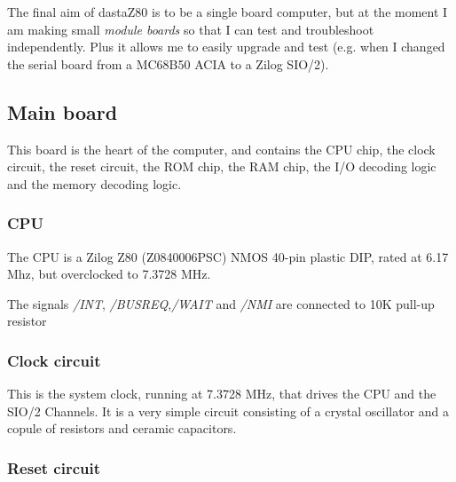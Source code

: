 \documentclass[a4paper,11pt]{article}
\begin{document}
    The final aim of dastaZ80 is to be a single board computer, but at the 
    moment I am making small \textit{module boards} so that I can test and 
    troubleshoot independently. Plus it allows me to easily upgrade and test
    (e.g. when I changed the serial board from a MC68B50 ACIA to a Zilog SIO/2).

    \subsection{Main board}

    This board is the heart of the computer, and contains the CPU chip, the 
    clock circuit, the reset circuit, the ROM chip, the RAM chip, the I/O
    decoding logic and the memory decoding logic.

    \subsubsection{CPU}

    The CPU is a Zilog Z80 (Z0840006PSC) NMOS 40-pin plastic DIP, rated at 6.17
    Mhz, but overclocked to 7.3728 MHz.

    The signals \textit{/INT}, \textit{/BUSREQ},\textit{/WAIT} and \textit{/NMI}
    are connected to 10K pull-up resistor

    \subsubsection{Clock circuit}

    This is the system clock, running at 7.3728 MHz, that drives the CPU and the
    SIO/2 Channels. It is a very simple circuit consisting of a crystal
    oscillator and a copule of resistors and ceramic capacitors.

    \subsubsection{Reset circuit}
    
\end{document}
